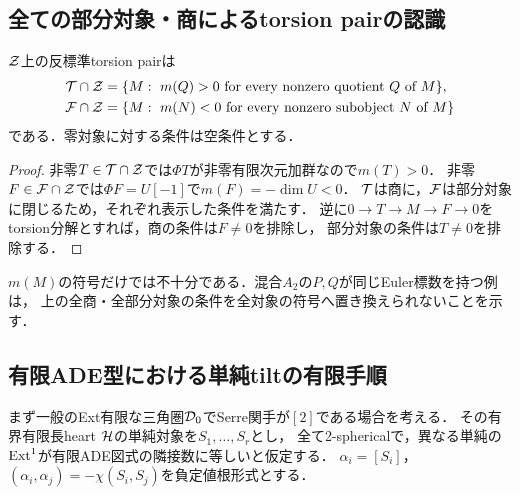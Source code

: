 \subsection{全ての部分対象・商によるtorsion pairの認識}
\begin{proposition}\label{prop:numericaltorsion}
$\mathcal Z$上の反標準torsion pairは
\[
\begin{split}
 \mathcal T\cap\mathcal Z&=\{M:\ m(Q)>0\text{ for every nonzero quotient }Q\text{ of }M\},\\
 \mathcal F\cap\mathcal Z&=\{M:\ m(N)<0\text{ for every nonzero subobject }N\text{ of }M\}
\end{split}
\]
である．零対象に対する条件は空条件とする．
\end{proposition}
\begin{proof}
非零$T\in\mathcal T\cap\mathcal Z$では$\Phi T$が非零有限次元加群なので$m(T)>0$．
非零$F\in\mathcal F\cap\mathcal Z$では$\Phi F=U[-1]$で$m(F)=-\dim U<0$．
$\mathcal T$は商に，$\mathcal F$は部分対象に閉じるため，それぞれ表示した条件を満たす．
逆に$0\to T\to M\to F\to0$をtorsion分解とすれば，商の条件は$F\ne0$を排除し，
部分対象の条件は$T\ne0$を排除する．
\end{proof}
$m(M)$の符号だけでは不十分である．混合$A_2$の$P,Q$が同じEuler標数を持つ例は，
上の全商・全部分対象の条件を全対象の符号へ置き換えられないことを示す．

\subsection{有限ADE型における単純tiltの有限手順}
まず一般のExt有限な三角圏$\mathcal D_0$でSerre関手が$[2]$である場合を考える．
その有界有限長heart $\mathcal H$の単純対象を$S_1,\ldots,S_r$とし，
全て2-sphericalで，異なる単純の$\operatorname{Ext}^1$が有限ADE図式の隣接数に等しいと仮定する．
$\alpha_i=[S_i]$，$(\alpha_i,\alpha_j)=-\chi(S_i,S_j)$を負定値根形式とする．

